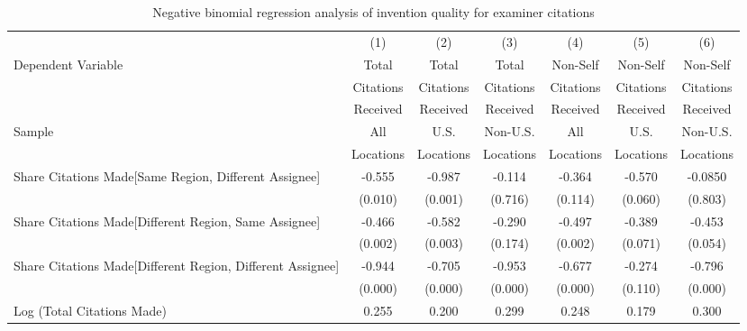 \begin{table}[htbp]\centering
\caption{Negative binomial regression analysis of invention quality for examiner citations \label{e.model123192021}}
\small
\onehalfspacing
\begin{adjustbox}{angle=90}
\begin{tabular}{l*{6}{c}}
\hline\hline
                &\multicolumn{1}{c}{(1)}&\multicolumn{1}{c}{(2)}&\multicolumn{1}{c}{(3)}&\multicolumn{1}{c}{(4)}&\multicolumn{1}{c}{(5)}&\multicolumn{1}{c}{(6)}\\
 \multirow{3}{*}{Dependent Variable} &\multicolumn{1}{c}{Total}&\multicolumn{1}{c}{Total}&\multicolumn{1}{c}{Total}&\multicolumn{1}{c}{Non-Self}&\multicolumn{1}{c}{Non-Self}&\multicolumn{1}{c}{Non-Self}\\
                &\multicolumn{1}{c}{Citations}&\multicolumn{1}{c}{Citations}&\multicolumn{1}{c}{Citations}&\multicolumn{1}{c}{Citations}&\multicolumn{1}{c}{Citations}&\multicolumn{1}{c}{Citations}\\
                 &\multicolumn{1}{c}{Received}&\multicolumn{1}{c}{Received}&\multicolumn{1}{c}{Received}&\multicolumn{1}{c}{Received}&\multicolumn{1}{c}{Received}&\multicolumn{1}{c}{Received}\\
                 \hline
 \multirow{2}{*}{Sample}&\multicolumn{1}{c}{All}&\multicolumn{1}{c}{U.S.}&\multicolumn{1}{c}{Non-U.S.}&\multicolumn{1}{c}{All}&\multicolumn{1}{c}{U.S.}&\multicolumn{1}{c}{Non-U.S.}\\       
  &\multicolumn{1}{c}{Locations}&\multicolumn{1}{c}{Locations}&\multicolumn{1}{c}{Locations}&\multicolumn{1}{c}{Locations}&\multicolumn{1}{c}{Locations}&\multicolumn{1}{c}{Locations}\\    \hline
Share Citations Made[Same Region, Different Assignee]&   -0.555&   -0.987&   -0.114&   -0.364&   -0.570&  -0.0850\\
                &  (0.010)&  (0.001)&  (0.716)&  (0.114)&  (0.060)&  (0.803)\\
Share Citations Made[Different Region, Same Assignee]&   -0.466&   -0.582&   -0.290&   -0.497&   -0.389&   -0.453\\
                &  (0.002)&  (0.003)&  (0.174)&  (0.002)&  (0.071)&  (0.054)\\
Share Citations Made[Different Region, Different Assignee]&   -0.944&   -0.705&   -0.953&   -0.677&   -0.274&   -0.796\\
                &  (0.000)&  (0.000)&  (0.000)&  (0.000)&  (0.110)&  (0.000)\\
Log (Total Citations Made)&    0.255&    0.200&    0.299&    0.248&    0.179&    0.300\\

\end{tabular}
\end{adjustbox}
\end{table}
